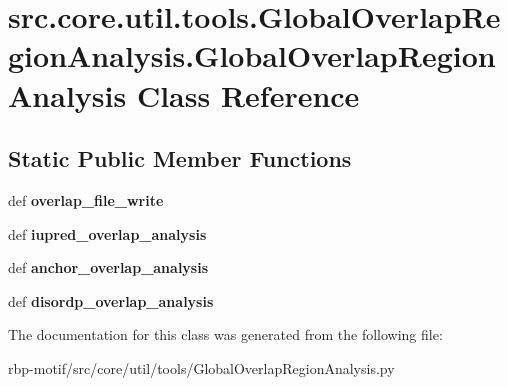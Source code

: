 \hypertarget{classsrc_1_1core_1_1util_1_1tools_1_1GlobalOverlapRegionAnalysis_1_1GlobalOverlapRegionAnalysis}{\section{src.\-core.\-util.\-tools.\-Global\-Overlap\-Region\-Analysis.\-Global\-Overlap\-Region\-Analysis Class Reference}
\label{classsrc_1_1core_1_1util_1_1tools_1_1GlobalOverlapRegionAnalysis_1_1GlobalOverlapRegionAnalysis}
}
\subsection*{Static Public Member Functions}
\begin{DoxyCompactItemize}
\item 
\hypertarget{classsrc_1_1core_1_1util_1_1tools_1_1GlobalOverlapRegionAnalysis_1_1GlobalOverlapRegionAnalysis_a72142d765cf144f7022e01a521d0511c}{def {\bfseries overlap\-\_\-file\-\_\-write}}\label{classsrc_1_1core_1_1util_1_1tools_1_1GlobalOverlapRegionAnalysis_1_1GlobalOverlapRegionAnalysis_a72142d765cf144f7022e01a521d0511c}

\item 
\hypertarget{classsrc_1_1core_1_1util_1_1tools_1_1GlobalOverlapRegionAnalysis_1_1GlobalOverlapRegionAnalysis_a5f4f19906a0a821a9f0b0e172f123ffe}{def {\bfseries iupred\-\_\-overlap\-\_\-analysis}}\label{classsrc_1_1core_1_1util_1_1tools_1_1GlobalOverlapRegionAnalysis_1_1GlobalOverlapRegionAnalysis_a5f4f19906a0a821a9f0b0e172f123ffe}

\item 
\hypertarget{classsrc_1_1core_1_1util_1_1tools_1_1GlobalOverlapRegionAnalysis_1_1GlobalOverlapRegionAnalysis_a75f513dd37e03dccb4aa28224116b084}{def {\bfseries anchor\-\_\-overlap\-\_\-analysis}}\label{classsrc_1_1core_1_1util_1_1tools_1_1GlobalOverlapRegionAnalysis_1_1GlobalOverlapRegionAnalysis_a75f513dd37e03dccb4aa28224116b084}

\item 
\hypertarget{classsrc_1_1core_1_1util_1_1tools_1_1GlobalOverlapRegionAnalysis_1_1GlobalOverlapRegionAnalysis_a38768040889ebade6a04eb62dfa6ad86}{def {\bfseries disordp\-\_\-overlap\-\_\-analysis}}\label{classsrc_1_1core_1_1util_1_1tools_1_1GlobalOverlapRegionAnalysis_1_1GlobalOverlapRegionAnalysis_a38768040889ebade6a04eb62dfa6ad86}

\end{DoxyCompactItemize}


The documentation for this class was generated from the following file\-:\begin{DoxyCompactItemize}
\item 
rbp-\/motif/src/core/util/tools/Global\-Overlap\-Region\-Analysis.\-py\end{DoxyCompactItemize}
